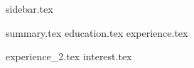 \documentclass[espanol]{cv-style}
\newcommand*{\sectiondir}{contents/}
\begin{document}
\lastupdated
\begin{sidebar}
{sidebar.tex}
\end{sidebar}
\hfill
\begin{mainframe}
{summary.tex}
{education.tex}
{experience.tex}
\end{mainframe}
\pagebreak
\begin{subframe}
{experience_2.tex}
{interest.tex}
\end{subframe}
\end{document}
